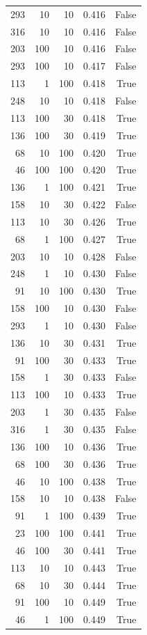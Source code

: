 \begin{tabular}{rrrrr}
293 & 10 & 10 & 0.416 & False \\
316 & 10 & 10 & 0.416 & False \\
203 & 100 & 10 & 0.416 & False \\
293 & 100 & 10 & 0.417 & False \\
113 & 1 & 100 & 0.418 & True \\
248 & 10 & 10 & 0.418 & False \\
113 & 100 & 30 & 0.418 & True \\
136 & 100 & 30 & 0.419 & True \\
68 & 10 & 100 & 0.420 & True \\
46 & 100 & 100 & 0.420 & True \\
136 & 1 & 100 & 0.421 & True \\
158 & 10 & 30 & 0.422 & False \\
113 & 10 & 30 & 0.426 & True \\
68 & 1 & 100 & 0.427 & True \\
203 & 10 & 10 & 0.428 & False \\
248 & 1 & 10 & 0.430 & False \\
91 & 10 & 100 & 0.430 & True \\
158 & 100 & 10 & 0.430 & False \\
293 & 1 & 10 & 0.430 & False \\
136 & 10 & 30 & 0.431 & True \\
91 & 100 & 30 & 0.433 & True \\
158 & 1 & 30 & 0.433 & False \\
113 & 100 & 10 & 0.433 & True \\
203 & 1 & 30 & 0.435 & False \\
316 & 1 & 30 & 0.435 & False \\
136 & 100 & 10 & 0.436 & True \\
68 & 100 & 30 & 0.436 & True \\
46 & 10 & 100 & 0.438 & True \\
158 & 10 & 10 & 0.438 & False \\
91 & 1 & 100 & 0.439 & True \\
23 & 100 & 100 & 0.441 & True \\
46 & 100 & 30 & 0.441 & True \\
113 & 10 & 10 & 0.443 & True \\
68 & 10 & 30 & 0.444 & True \\
91 & 100 & 10 & 0.449 & True \\
46 & 1 & 100 & 0.449 & True \\

\end{tabular}
